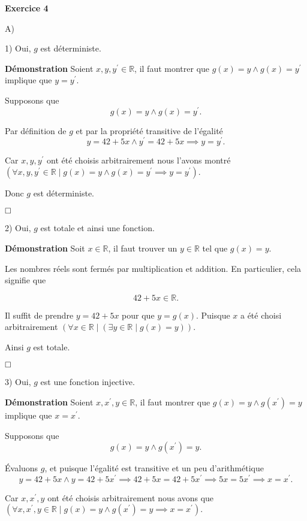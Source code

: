 \documentclass{article}
\begin{document}
\textbf{Exercice 4}

\vspace{0.5cm}

A)

1) Oui, $g$ est déterministe.

\textbf{Démonstration} Soient $x, y, y^{\prime} \in \mathbb{R}$, il faut montrer que $g(x) = y \land g(x) = y^{\prime}$ implique que $y = y^{\prime}$.

Supposons que  
$$ g(x) = y \land g(x) = y^{\prime}. $$

Par définition de $g$ et par la propriété transitive de l'égalité 
$$ y = 42 + 5x \land y^{\prime} = 42 + 5x \implies y = y^{\prime}. $$

Car $x, y, y^{\prime}$ ont été choisis arbitrairement nous l'avons montré $ ( \forall x, y, y^{\prime} \in \mathbb{R} \mid g(x) = y \land g(x) = y^{\prime} \implies y = y^{\prime}). $

Donc $g$ est déterministe. 

$\hfill \square$

2) Oui, $g$ est totale et ainsi une fonction.

\textbf{Démonstration} Soit $x \in \mathbb{R}$, il faut trouver un $y \in \mathbb{R}$ tel que $g(x) = y$.

Les nombres réels sont fermés par multiplication et addition. En particulier, cela signifie que

$$ 42 + 5x  \in \mathbb{R}. $$

Il suffit de prendre $y = 42 + 5x$ pour que $y = g(x)$. Puisque $x$ a été choisi arbitrairement $( \forall x \in \mathbb{R} \mid ( \exists y \in \mathbb{R} \mid g(x) = y ) ).$


Ainsi $g$ est totale.

$\hfill \square$

3) Oui, $g$ est une fonction injective.

\textbf{Démonstration} Soient $x, x^{\prime}, y \in \mathbb{R}$, il faut montrer que $g(x) = y \land g(x^{\prime}) = y$ implique que $x = x^{\prime}$.

Supposons que  
$$ g(x) = y \land g(x^{\prime}) = y. $$

Évaluons $g$, et puisque l'égalité est transitive et un peu d'arithmétique
$$ y = 42 + 5x \land y = 42 + 5x^{\prime} \implies 42 + 5x = 42 + 5x^{\prime} \implies 5x = 5x^{\prime} \implies x = x^{\prime}. $$

Car $x, x^{\prime}, y$ ont été choisis arbitrairement nous avons que $ ( \forall x, x^{\prime}, y \in \mathbb{R} \mid g(x) = y \land g(x^{\prime}) = y \implies x = x^{\prime}). $
\end{document}

